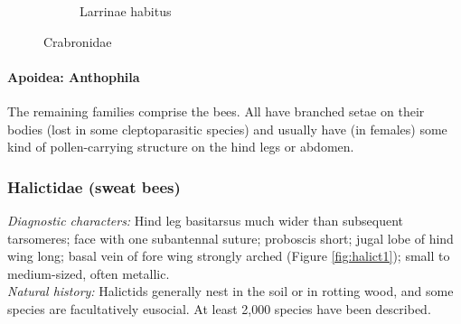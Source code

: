 \documentclass[letterpaper, 11pt]{article}
\begin{document}
\begin{figure}[ht!]
\begin{subfigure}[ht!]{0.4\textwidth}
        \caption{Larrinae habitus \citep[][Fig. 102]{goulet1993hymenoptera}}
        \label{fig:crabronid2}
    \end{subfigure}
    \caption{Crabronidae}\label{fig:crabronids}
\end{figure}
\FloatBarrier

\paragraph*{Apoidea: Anthophila} The remaining families comprise the bees. All have branched setae on their bodies (lost in some cleptoparasitic species) and usually have (in females) some kind of pollen-carrying structure on the hind legs or abdomen.

\subsubsection{Halictidae (sweat bees)}
\noindent{}\textit{Diagnostic characters:} Hind leg basitarsus much wider than subsequent tarsomeres; face with one subantennal suture; proboscis short; jugal lobe of hind wing long; basal vein of fore wing strongly arched (Figure \ref{fig:halict1}); small to medium-sized, often metallic.\\

\noindent{}\textit{Natural history:} Halictids generally nest in the soil or in rotting wood, and some species are facultatively eusocial. At least 2,000 species have been described.\\
\end{document}
